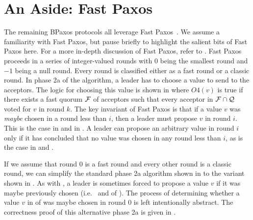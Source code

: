 \section{An Aside: Fast Paxos}


The remaining BPaxos protocols all leverage Fast Paxos~\cite{lamport2006fast}.
We assume a familiarity with Fast Paxos, but pause briefly to highlight the
salient bits of Fast Paxos here. For a more in-depth discussion of Fast Paxos,
refer to .
%
Fast Paxos proceeds in a series of integer-valued rounds with $0$ being the
smallest round and $-1$ being a null round. Every round is classified either as
a fast round or a classic round. In phase 2a of the algorithm, a leader has to
choose a value to send to the acceptors. The logic for choosing this value is
shown in  where $O4(v)$ is true if there exists a fast
quorum $\mathcal{F}$ of acceptors such that every acceptor in $\mathcal{F} \cap
\mathcal{Q}$ voted for $v$ in round $k$.
%
The key invariant of Fast Paxos is that if a value $v$ was \emph{maybe} chosen
in a round less than $i$, then a leader must propose $v$ in round $i$. This is
the case in  and  in
. A leader can propose an arbitrary value in round $i$ only
if it has concluded that no value was chosen in any round less than $i$, as is
the case in  and .

If we assume that round $0$ is a fast round and every other round is a classic
round, we can simplify the standard phase 2a algorithm shown in
 to the variant shown in . As with
, a leader is sometimes forced to propose a value $v$ if it
was maybe previously chosen (i.e.\  and
 of ). The process of
determining whether a value $v$ in  of
 was maybe chosen in round $0$ is left
intentionally abstract. The correctness proof of this alternative phase 2a is
given in .
